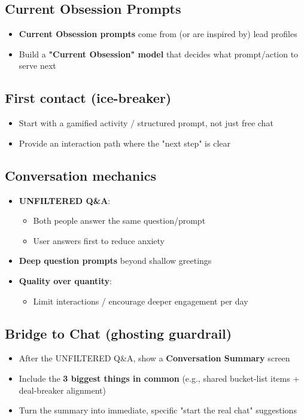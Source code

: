 \documentclass[10pt,a4paper]{article}
\begin{document}
\subsection*{\color{eublue}Current Obsession Prompts}
\begin{itemize}
\item \textbf{Current Obsession prompts} come from (or are inspired by) lead profiles
\item Build a \textbf{"Current Obsession" model} that decides what prompt/action to serve next
\end{itemize}

\subsection*{\color{eublue}First contact (ice-breaker)}
\begin{itemize}
\item Start with a gamified activity / structured prompt, not just free chat
\item Provide an interaction path where the "next step" is clear
\end{itemize}

\subsection*{\color{eublue}Conversation mechanics}
\begin{itemize}
\item \textbf{UNFILTERED Q\&A}:
\begin{itemize}
\item Both people answer the same question/prompt
\item User answers first to reduce anxiety
\end{itemize}
\item \textbf{Deep question prompts} beyond shallow greetings
\item \textbf{Quality over quantity}:
\begin{itemize}
\item Limit interactions / encourage deeper engagement per day
\end{itemize}
\end{itemize}

\subsection*{\color{eublue}Bridge to Chat (ghosting guardrail)}
\begin{itemize}
\item After the UNFILTERED Q\&A, show a \textbf{Conversation Summary} screen
\item Include the \textbf{3 biggest things in common} (e.g., shared bucket-list items + deal-breaker alignment)
\item Turn the summary into immediate, specific "start the real chat" suggestions
\end{itemize}
\end{document}
